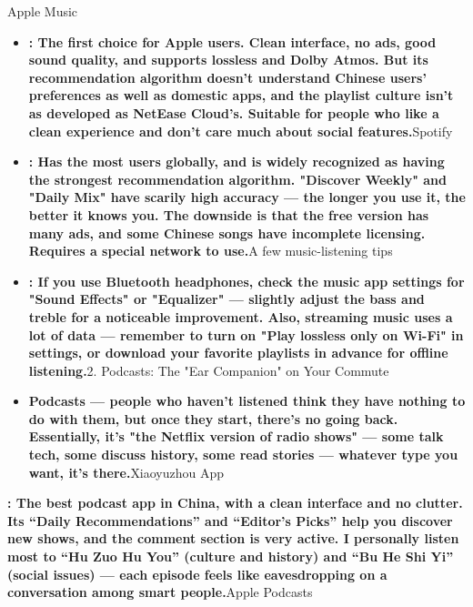 


Apple Music

\begin{itemize}
  \item \textbf{: The first choice for Apple users. Clean interface, no ads, good sound quality, and supports lossless and Dolby Atmos. But its recommendation algorithm doesn't understand Chinese users' preferences as well as domestic apps, and the playlist culture isn't as developed as NetEase Cloud's. Suitable for people who like a clean experience and don't care much about social features.}Spotify
  \item \textbf{: Has the most users globally, and is widely recognized as having the strongest recommendation algorithm. "Discover Weekly" and "Daily Mix" have scarily high accuracy — the longer you use it, the better it knows you. The downside is that the free version has many ads, and some Chinese songs have incomplete licensing. Requires a special network to use.}A few music-listening tips
  \item \textbf{: If you use Bluetooth headphones, check the music app settings for "Sound Effects" or "Equalizer" — slightly adjust the bass and treble for a noticeable improvement. Also, streaming music uses a lot of data — remember to turn on "Play lossless only on Wi-Fi" in settings, or download your favorite playlists in advance for offline listening.}2. Podcasts: The "Ear Companion" on Your Commute
  \item \textbf{Podcasts — people who haven't listened think they have nothing to do with them, but once they start, there's no going back. Essentially, it's "the Netflix version of radio shows" — some talk tech, some discuss history, some read stories — whatever type you want, it's there.}Xiaoyuzhou App
\end{itemize}

\textbf{: The best podcast app in China, with a clean interface and no clutter. Its “Daily Recommendations” and “Editor's Picks” help you discover new shows, and the comment section is very active. I personally listen most to “Hu Zuo Hu You” (culture and history) and “Bu He Shi Yi” (social issues) — each episode feels like eavesdropping on a conversation among smart people.}Apple Podcasts


